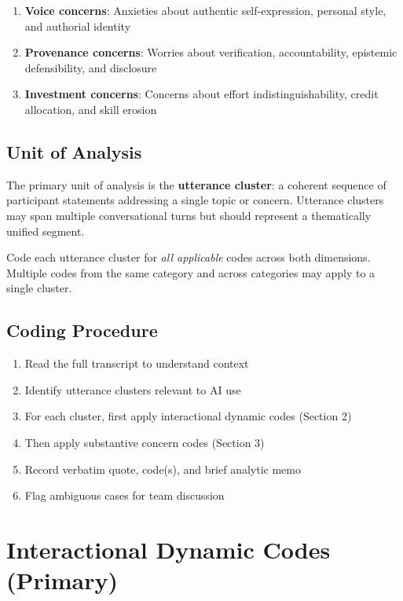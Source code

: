 \documentclass[11pt]{article}
\begin{document}
\begin{enumerate}[leftmargin=*]
\item \textbf{Voice concerns}: Anxieties about authentic self-expression, personal style, and authorial identity
\item \textbf{Provenance concerns}: Worries about verification, accountability, epistemic defensibility, and disclosure
\item \textbf{Investment concerns}: Concerns about effort indistinguishability, credit allocation, and skill erosion
\end{enumerate}

\subsection{Unit of Analysis}

The primary unit of analysis is the \textbf{utterance cluster}: a coherent sequence of participant statements addressing a single topic or concern. Utterance clusters may span multiple conversational turns but should represent a thematically unified segment.

Code each utterance cluster for \textit{all applicable} codes across both dimensions. Multiple codes from the same category and across categories may apply to a single cluster.

\subsection{Coding Procedure}

\begin{enumerate}[leftmargin=*]
\item Read the full transcript to understand context
\item Identify utterance clusters relevant to AI use
\item For each cluster, first apply interactional dynamic codes (Section 2)
\item Then apply substantive concern codes (Section 3)
\item Record verbatim quote, code(s), and brief analytic memo
\item Flag ambiguous cases for team discussion
\end{enumerate}

\newpage
\section{Interactional Dynamic Codes (Primary)}
\end{document}
